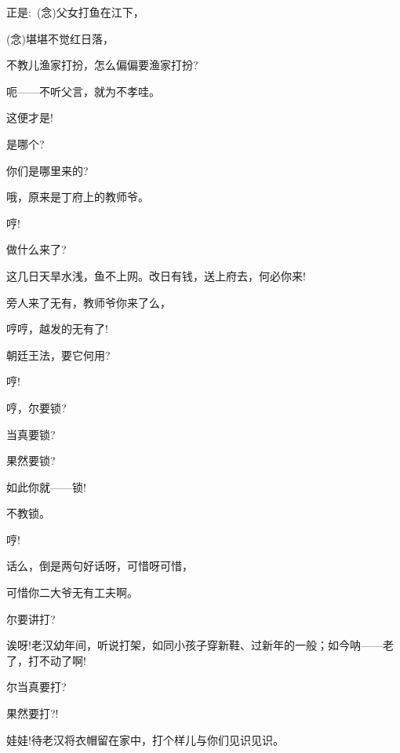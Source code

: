{{正是:~({\akai 念})父女打鱼在江下，}

{({\akai 念})堪堪不觉红日落，}

\vspace{5pt}


{不教儿渔家打扮，怎么偏偏要渔家打扮?}

{呃------不听父言，就为不孝哇。}

{这便才是!}

{是哪个?}\hspace{10pt}~

{你们是哪里来的?}

{哦，原来是丁府上的教师爷。}

{哼!}\hspace{30pt}~

{做什么来了?}

{这几日天旱水浅，鱼不上网。改日有钱，送上府去，何必你来!}

{旁人来了无有，教师爷你来了么，}

{哼哼，越发的无有了!}

{朝廷王法，要它何用?}

{哼!}\hspace{30pt}~

{哼，尔要锁?}

{当真要锁?}

{果然要锁?}

{如此你就------锁!}

{不教锁。}\hspace{10pt}~

{哼!}\hspace{30pt}~

{话么，倒是两句好话呀，可惜呀可惜，}

{可惜你二大爷无有工夫啊。}

{尔要讲打?}

{诶呀!老汉幼年间，听说打架，如同小孩子穿新鞋、过新年的一般；如今呐------老了，打不动了啊!}

{尔当真要打?}

{果然要打?!}

{娃娃!待老汉将衣帽留在家中，打个样儿与你们见识见识。}

}
